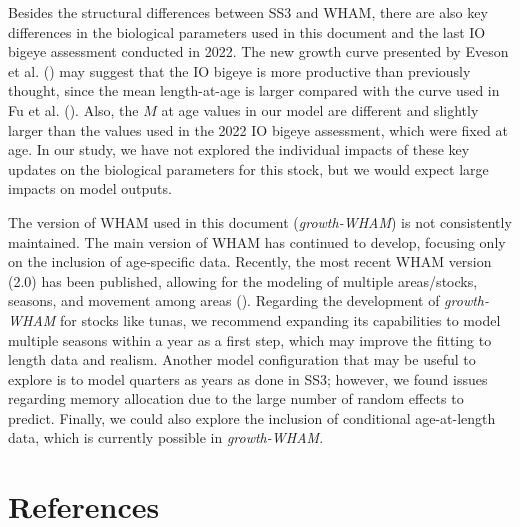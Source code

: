\documentclass[
]{scrartcl}
\begin{document}
Besides the structural differences between SS3 and WHAM, there are also
key differences in the biological parameters used in this document and
the last IO bigeye assessment conducted in 2022. The new growth curve
presented by Eveson et al.
() may suggest that
the IO bigeye is more productive than previously thought, since the mean
length-at-age is larger compared with the curve used in Fu et al.
(). Also, the \(M\) at
age values in our model are different and slightly larger than the
values used in the 2022 IO bigeye assessment, which were fixed at age.
In our study, we have not explored the individual impacts of these key
updates on the biological parameters for this stock, but we would expect
large impacts on model outputs.

The version of WHAM used in this document (\emph{growth-WHAM}) is not
consistently maintained. The main version of WHAM has continued to
develop, focusing only on the inclusion of age-specific data. Recently,
the most recent WHAM version (2.0) has been published, allowing for the
modeling of multiple areas/stocks, seasons, and movement among areas
().
Regarding the development of \emph{growth-WHAM} for stocks like tunas,
we recommend expanding its capabilities to model multiple seasons within
a year as a first step, which may improve the fitting to length data and
realism. Another model configuration that may be useful to explore is to
model quarters as years as done in SS3; however, we found issues
regarding memory allocation due to the large number of random effects to
predict. Finally, we could also explore the inclusion of conditional
age-at-length data, which is currently possible in \emph{growth-WHAM}.

\section{References}\label{references}
\end{document}
